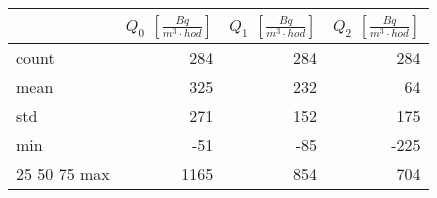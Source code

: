 \begin{tabular}{lrrr}
\toprule
{} &  $Q_0$ $\left[\si{\frac{Bq}{m^3\cdot hod}}\right]$ &  $Q_1$ $\left[\si{\frac{Bq}{m^3\cdot hod}}\right]$ &  $Q_2$ $\left[\si{\frac{Bq}{m^3\cdot hod}}\right]$ \\
\midrule
count &                                                284 &                                                284 &                                                284 \\
mean  &                                                325 &                                                232 &                                                 64 \\
std   &                                                271 &                                                152 &                                                175 \\
min   &                                                -51 &                                                -85 &                                               -225 \\
25%
50%
75%
max   &                                               1165 &                                                854 &                                                704 \\
\bottomrule
\end{tabular}
